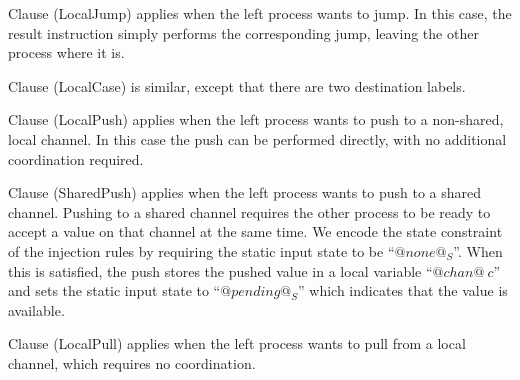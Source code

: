 


Clause (LocalJump) applies when the left process wants to jump.
In this case, the result instruction simply performs the corresponding jump, leaving the other process where it is. 


Clause (LocalCase) is similar, except that there are two destination labels.

Clause (LocalPush) applies when the left process wants to push to a non-shared, local channel.
In this case the push can be performed directly, with no additional coordination required.

Clause (SharedPush) applies when the left process wants to push to a shared channel. Pushing to a shared channel requires the other process to be ready to accept a value on that channel at the same time. We encode the state constraint of the injection rules by requiring the static input state to be ``$@none@_S$''. When this is satisfied, the push stores the pushed value in a local variable ``$@chan@~c$'' and sets the static input state to ``$@pending@_S$'' which indicates that the value is available.


\eject{}
Clause (LocalPull) applies when the left process wants to pull from a local channel, which requires no coordination.

